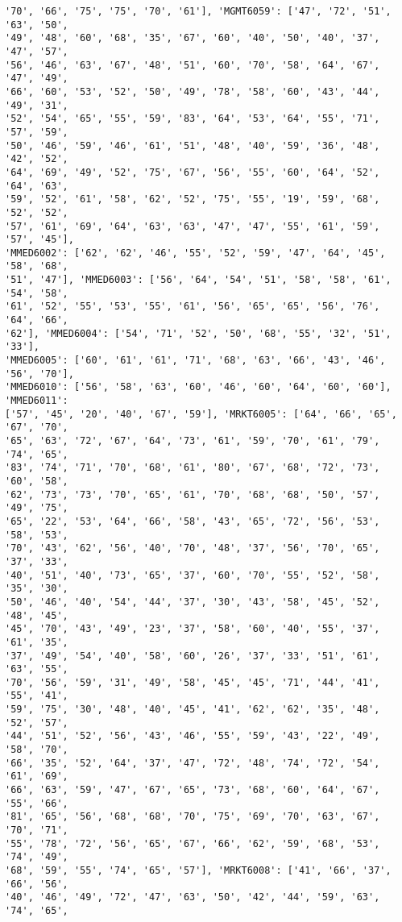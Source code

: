 \documentclass[11pt]{article}
\begin{document}
\begin{Verbatim}[commandchars=\\\{\}]
'70', '66', '75', '75', '70', '61'], 'MGMT6059': ['47', '72', '51', '63', '50',
'49', '48', '60', '68', '35', '67', '60', '40', '50', '40', '37', '47', '57',
'56', '46', '63', '67', '48', '51', '60', '70', '58', '64', '67', '47', '49',
'66', '60', '53', '52', '50', '49', '78', '58', '60', '43', '44', '49', '31',
'52', '54', '65', '55', '59', '83', '64', '53', '64', '55', '71', '57', '59',
'50', '46', '59', '46', '61', '51', '48', '40', '59', '36', '48', '42', '52',
'64', '69', '49', '52', '75', '67', '56', '55', '60', '64', '52', '64', '63',
'59', '52', '61', '58', '62', '52', '75', '55', '19', '59', '68', '52', '52',
'57', '61', '69', '64', '63', '63', '47', '47', '55', '61', '59', '57', '45'],
'MMED6002': ['62', '62', '46', '55', '52', '59', '47', '64', '45', '58', '68',
'51', '47'], 'MMED6003': ['56', '64', '54', '51', '58', '58', '61', '54', '58',
'61', '52', '55', '53', '55', '61', '56', '65', '65', '56', '76', '64', '66',
'62'], 'MMED6004': ['54', '71', '52', '50', '68', '55', '32', '51', '33'],
'MMED6005': ['60', '61', '61', '71', '68', '63', '66', '43', '46', '56', '70'],
'MMED6010': ['56', '58', '63', '60', '46', '60', '64', '60', '60'], 'MMED6011':
['57', '45', '20', '40', '67', '59'], 'MRKT6005': ['64', '66', '65', '67', '70',
'65', '63', '72', '67', '64', '73', '61', '59', '70', '61', '79', '74', '65',
'83', '74', '71', '70', '68', '61', '80', '67', '68', '72', '73', '60', '58',
'62', '73', '73', '70', '65', '61', '70', '68', '68', '50', '57', '49', '75',
'65', '22', '53', '64', '66', '58', '43', '65', '72', '56', '53', '58', '53',
'70', '43', '62', '56', '40', '70', '48', '37', '56', '70', '65', '37', '33',
'40', '51', '40', '73', '65', '37', '60', '70', '55', '52', '58', '35', '30',
'50', '46', '40', '54', '44', '37', '30', '43', '58', '45', '52', '48', '45',
'45', '70', '43', '49', '23', '37', '58', '60', '40', '55', '37', '61', '35',
'37', '49', '54', '40', '58', '60', '26', '37', '33', '51', '61', '63', '55',
'70', '56', '59', '31', '49', '58', '45', '45', '71', '44', '41', '55', '41',
'59', '75', '30', '48', '40', '45', '41', '62', '62', '35', '48', '52', '57',
'44', '51', '52', '56', '43', '46', '55', '59', '43', '22', '49', '58', '70',
'66', '35', '52', '64', '37', '47', '72', '48', '74', '72', '54', '61', '69',
'66', '63', '59', '47', '67', '65', '73', '68', '60', '64', '67', '55', '66',
'81', '65', '56', '68', '68', '70', '75', '69', '70', '63', '67', '70', '71',
'55', '78', '72', '56', '65', '67', '66', '62', '59', '68', '53', '74', '49',
'68', '59', '55', '74', '65', '57'], 'MRKT6008': ['41', '66', '37', '66', '56',
'40', '46', '49', '72', '47', '63', '50', '42', '44', '59', '63', '74', '65',

\end{Verbatim}
\end{document}

